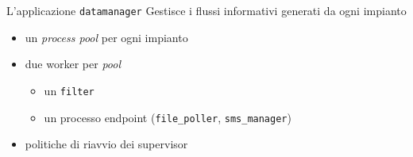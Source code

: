\documentclass{beamer}
\newcommand{\red}[1]{\textcolor[rgb]{.8,0,0}{#1}}
\newcommand{\green}[1]{\textcolor[rgb]{0,.6,.1}{#1}}
\begin{document}
%
%

%
%

%
\begin{frame}{L'applicazione \texttt{datamanager}}
%
Gestisce i flussi informativi generati da ogni impianto
%
\begin{figure}[!h]
  \begin{center}
  \end{center}
\end{figure}
%
\begin{itemize}
\item un \emph{process pool} per ogni impianto
\item due \red{worker} per \emph{pool}
  \begin{itemize}
  \item un \texttt{filter}
  \item un processo \red{endpoint} (\texttt{file\_poller}, \texttt{sms\_manager})
  \end{itemize}
\item politiche di \red{riavvio} dei supervisor
\end{itemize}
%
\end{frame}
%
\end{document}
